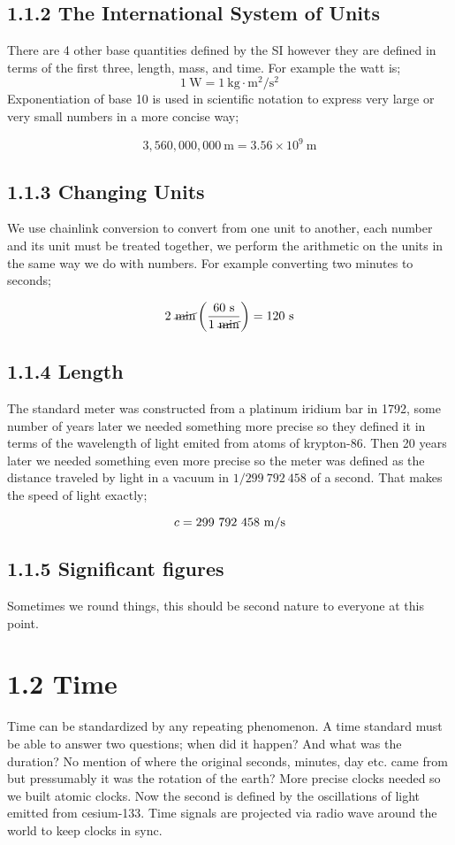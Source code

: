 \documentclass{article}
\begin{document}
\subsection*{1.1.2 The International System of Units}

There are 4 other base quantities defined by the SI however they are defined in terms of the first three, length, mass, and time. For example the watt is;
\[
	1\ \unit{\watt} = 1\ \unit{\kilo\gram} \cdot \unit{\meter^2\per\second^2}
\]
Exponentiation of base 10 is used in scientific notation to express very large or very small numbers in a more concise way;

\[
	3,560,000,000\ \unit{\meter} = 3.56 \times 10^9\ \unit{\meter}
\]

\subsection*{1.1.3 Changing Units}

We use chainlink conversion to convert from one unit to another, each number and its unit must be treated together, we perform the arithmetic on the units in the same way we do with numbers. For example converting two minutes to seconds;

\[
	2\ \cancel{\unit{\minute}} \left( \frac{60\ \unit{\second}}{1\ \cancel{\unit{\minute}}} \right) = 120\ \unit{\second}
\]

\subsection*{1.1.4 Length}

The standard meter was constructed from a platinum iridium bar in 1792, some number of years later we needed something more precise so they defined it in terms of the wavelength of light emited from atoms of krypton-86. Then 20 years later we needed something even more precise so the meter was defined as the distance traveled by light in a vacuum in $1/299\ 792\ 458$ of a second. That makes the speed of light exactly;

\[
	c = 299\ 792\ 458\ \unit{{\meter\per\second}}
\]

\subsection*{1.1.5 Significant figures}

Sometimes we round things, this should be second nature to everyone at this point.

\section*{1.2 Time}
Time can be standardized by any repeating phenomenon. A time standard must be able to answer two questions; when did it happen? And what was the duration? No mention of where the original seconds, minutes, day etc. came from but pressumably it was the rotation of the earth? More precise clocks needed so we built atomic clocks. Now the second is defined by the oscillations of light emitted from cesium-133. Time signals are projected via radio wave around the world to keep clocks in sync.
\end{document}
